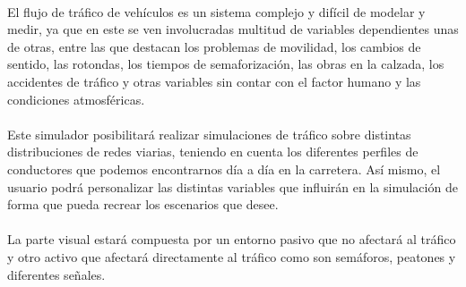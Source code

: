 \paragraph{}
El flujo de tráfico de vehículos es un sistema complejo y difícil de modelar y medir, ya que en este se ven involucradas multitud de variables dependientes unas de otras, entre las que destacan los problemas de movilidad, los cambios de sentido, las rotondas, los tiempos de semaforización, las obras en la calzada, los accidentes de tráfico y otras variables sin contar con el factor humano y las condiciones atmosféricas.

\paragraph{}
Este simulador posibilitará realizar simulaciones de tráfico sobre distintas distribuciones de redes viarias, teniendo en cuenta los diferentes perfiles de conductores que podemos encontrarnos día a día en la carretera. Así mismo, el usuario podrá personalizar las distintas variables que influirán en la simulación de forma que pueda recrear los escenarios que desee.

\paragraph{}
La parte visual estará compuesta por un entorno pasivo que no afectará al tráfico y otro activo que afectará directamente al tráfico como son semáforos, peatones y diferentes señales. 
